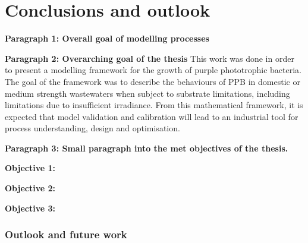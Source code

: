 \chapter[Conclusions and outlook]{Conclusions and outlook}
\label{chap:conclusion}

\textbf{Paragraph 1: Overall goal of modelling processes}





\textbf{Paragraph 2: Overarching goal of the thesis}
This work was done in order to present a modelling framework for the growth of purple phototrophic bacteria. The goal of the framework was to describe the behaviours of PPB in domestic or medium strength wastewaters when subject to substrate limitations, including limitations due to insufficient irradiance. From this mathematical framework, it is expected that model validation and calibration will lead to an industrial tool for process understanding, design and optimisation. 

\textbf{Paragraph 3: Small paragraph into the met objectives of the thesis.}




\textbf{Objective 1: }







\textbf{Objective 2: }





\textbf{Objective 3: }






\subsection{Outlook and future work}